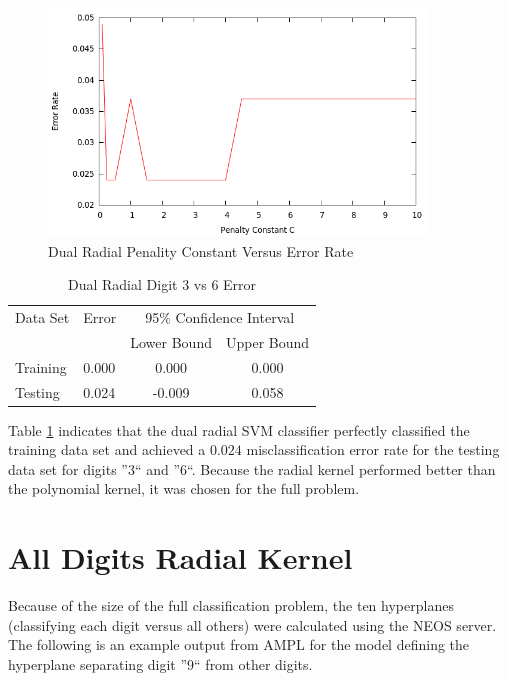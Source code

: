 \documentclass{article}
\begin{document}
\begin{figure}\label{cvserror2}
\centering
\includegraphics[width=0.9\textwidth]{radial_c_vs_error_rate.png}
\caption{Dual Radial Penality Constant Versus Error Rate}
\end{figure}

\begin{table}\label{table4}
\caption{Dual Radial Digit 3 vs 6 Error}
\begin{center}
\begin{tabular}{llcc}
\toprule
Data Set & Error & \multicolumn{2}{c}{95\% Confidence Interval} \\
\cmidrule(r){3-4}
& & Lower Bound & Upper Bound \\
\midrule
Training & 0.000 & 0.000 & 0.000 \\
Testing & 0.024 & -0.009 & 0.058 \\
\bottomrule
\end{tabular}
\end{center}
\end{table}

Table \ref{table4} indicates that the dual radial SVM classifier perfectly classified the training data set and achieved a \(0.024\) misclassification error rate for the testing data set for digits ''3`` and ''6``. Because the radial kernel performed better than the polynomial kernel, it was chosen for the full problem.

\section{All Digits Radial Kernel}\label{full1}

Because of the size of the full classification problem, the ten hyperplanes (classifying each digit versus all others) were calculated using the NEOS server. The following is an example output from AMPL for the model defining the hyperplane separating digit ''9`` from other digits.
\end{document}
